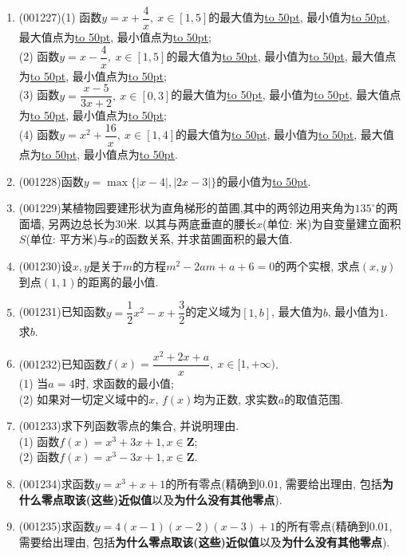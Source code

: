 \documentclass[10pt,a4paper]{article}
\newcommand{\blank}[1]{\underline{\hbox to #1pt{}}}
\begin{document}
\begin{enumerate}[1.]
(2) 函数$y=2x^2-8x, \ x\in [-1,4]$的最大值为\blank{50}, 最小值为\blank{50}, 最大值点为\blank{50}, 最小值点为\blank{50};\\ 
(3) 函数$y=6x-x^2, \ x\in [-3,0]$的最大值为\blank{50}, 最小值为\blank{50}, 最大值点为\blank{50}, 最小值点为\blank{50};\\ 
(4) 函数$y=2x^2-4x+5, \ x\in [2,4]$的最大值为\blank{50}, 最小值为\blank{50}, 最大值点为\blank{50}, 最小值点为\blank{50}.
\item {\tiny (001227)}(1) 函数$y=x+\dfrac{4}{x}, \ x\in [1,5]$的最大值为\blank{50}, 最小值为\blank{50}, 最大值点为\blank{50}, 最小值点为\blank{50};\\ 
(2) 函数$y=x-\dfrac{4}{x}, \ x\in [1,5]$的最大值为\blank{50}, 最小值为\blank{50}, 最大值点为\blank{50}, 最小值点为\blank{50};\\ 
(3) 函数$y=\dfrac{x-5}{3x+2}, \ x\in [0,3]$的最大值为\blank{50}, 最小值为\blank{50}, 最大值点为\blank{50}, 最小值点为\blank{50};\\ 
(4) 函数$y=x^2+\dfrac{16}{x}, \ x\in [1,4]$的最大值为\blank{50}, 最小值为\blank{50}, 最大值点为\blank{50}, 最小值点为\blank{50}.
\item {\tiny (001228)}函数$y=\max\{|x-4|,|2x-3|\}$的最小值为\blank{50}.
\item {\tiny (001229)}某植物园要建形状为直角梯形的苗圃,其中的两邻边用夹角为$135^\circ$的两面墙, 另两边总长为$30$米. 以其与两底垂直的腰长$x$(单位: 米)为自变量建立面积$S$(单位: 平方米)与$x$的函数关系, 并求苗圃面积的最大值.
\item {\tiny (001230)}设$x,y$是关于$m$的方程$m^2-2am+a+6=0$的两个实根, 求点$(x,y)$到点$(1,1)$的距离的最小值.
\item {\tiny (001231)}已知函数$y=\dfrac{1}{2}x^2-x+\dfrac{3}{2}$的定义域为$[1,b]$, 最大值为$b$, 最小值为$1$. 求$b$.
\item {\tiny (001232)}已知函数$f(x)=\dfrac{x^2+2x+a}{x}, \ x \in [1,+\infty)$.\\ 
(1) 当$a=4$时, 求函数的最小值;\\ 
(2) 如果对一切定义域中的$x$, $f(x)$均为正数, 求实数$a$的取值范围.
\item {\tiny (001233)}求下列函数零点的集合, 并说明理由.\\ 
(1) 函数$f(x)=x^3+3x+1,x\in\mathbf{Z}$;\\ 
(2) 函数$f(x)=x^3-3x+1,x\in\mathbf{Z}$.
\item {\tiny (001234)}求函数$y=x^3+x+1$的所有零点(精确到$0.01$, 需要给出理由, 包括{\bf 为什么零点取该(这些)近似值}以及{\bf 为什么没有其他零点}).
\item {\tiny (001235)}求函数$y=4(x-1)(x-2)(x-3)+1$的所有零点(精确到$0.01$, 需要给出理由, 包括{\bf 为什么零点取该(这些)近似值}以及{\bf 为什么没有其他零点}).

\end{enumerate}
\end{document}
